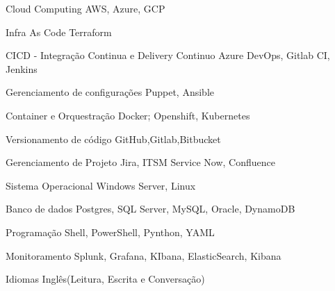 

\begin{cvskills}

  \cvskill
    {Cloud Computing} %
    {AWS, Azure, GCP} %

  \cvskill
    {Infra As Code} %
    {Terraform} %

  \cvskill
    {CICD - Integração Continua e Delivery Continuo} %
    {Azure DevOps, Gitlab CI, Jenkins} %

  \cvskill
    {Gerenciamento de configurações} %
    {Puppet, Ansible} %

  \cvskill
    {Container e Orquestração} %
    {Docker; Openshift, Kubernetes} %

  \cvskill
    {Versionamento de código} %
    {GitHub,Gitlab,Bitbucket} %

  \cvskill
    {Gerenciamento de Projeto} %
    {Jira, ITSM Service Now, Confluence} %

  \cvskill
    {Sistema Operacional} %
    {Windows Server, Linux} %

  \cvskill
    {Banco de dados} %
    {Postgres, SQL Server, MySQL, Oracle, DynamoDB} %

  \cvskill
    {Programação} %
    {Shell, PowerShell, Pynthon, YAML} %

  \cvskill
    {Monitoramento} %
    {Splunk, Grafana, KIbana, ElasticSearch, Kibana} %

  \cvskill
    {Idiomas} %
    {Inglês(Leitura, Escrita e Conversação)} %

\end{cvskills}
